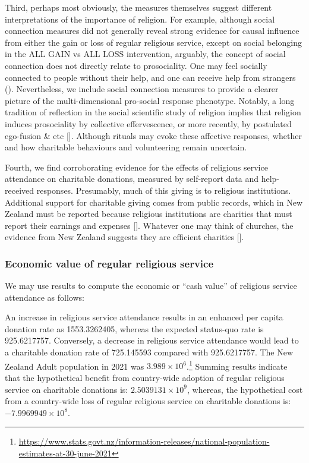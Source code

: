 \documentclass[
  singlecolumn]{article}
\begin{document}
Third, perhaps most obviously, the measures themselves suggest different
interpretations of the importance of religion. For example, although
social connection measures did not generally reveal strong evidence for
causal influence from either the gain or loss of regular religious
service, except on social belonging in the ALL GAIN vs ALL LOSS
intervention, arguably, the concept of social connection does not
directly relate to prosociality. One may feel socially connected to
people without their help, and one can receive help from strangers
(). Nevertheless,
we include social connection measures to provide a clearer picture of
the multi-dimensional pro-social response phenotype. Notably, a long
tradition of reflection in the social scientific study of religion
implies that religion induces prosociality by collective effervescence,
or more recently, by postulated ego-fusion \& etc {[}{]}. Although
rituals may evoke these affective responses, whether and how charitable
behaviours and volunteering remain uncertain.

Fourth, we find corroborating evidence for the effects of religious
service attendance on charitable donations, measured by self-report data
and help-received responses. Presumably, much of this giving is to
religious institutions. Additional support for charitable giving comes
from public records, which in New Zealand must be reported because
religious institutions are charities that must report their earnings and
expenses {[}{]}. Whatever one may think of churches, the evidence from
New Zealand suggests they are efficient charities {[}{]}.

\subsubsection{Economic value of regular religious
service}\label{economic-value-of-regular-religious-service}

We may use results to compute the economic or ``cash value'' of
religious service attendance as follows:

An increase in religious service attendance results in an enhanced per
capita donation rate as 1553.3262405, whereas the expected status-quo
rate is 925.6217757. Conversely, a decrease in religious service
attendance would lead to a charitable donation rate of 725.145593
compared with 925.6217757. The New Zealand Adult population in 2021 was
\ensuremath{3.989\times 10^{6}}.\footnote{\url{https://www.stats.govt.nz/information-releases/national-population-estimates-at-30-june-2021}}
Summing results indicate that the hypothetical benefit from country-wide
adoption of regular religious service on charitable donations is:
\ensuremath{2.5039131\times 10^{9}}, whereas, the hypothetical cost from
a country-wide loss of regular religious service on charitable donations
is: \ensuremath{-7.9969949\times 10^{8}}.
\end{document}
